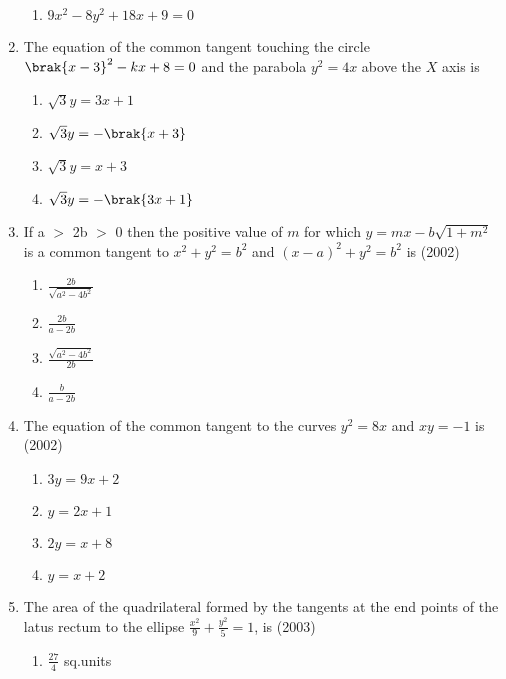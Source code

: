 \begin{enumerate}
\begin{multicols}{2}
\begin{enumerate}
    \item $9x^2-8y^2+18x+9=0$
\end{enumerate}
\end{multicols}
\item The equation of the common tangent touching the circle $\brak{x-3}^2-kx+8=0$ and the parabola $y^2=4x$ above the $X$ axis is 
      \hfill{}
\begin{multicols}{2}
\begin{enumerate}
    \item $\sqrt{3}y=3x+1$
    \item $\sqrt{3}y=-\brak{x+3}$
    \item $\sqrt{3}y=x+3$
    \item $\sqrt{3}y=-\brak{3x+1}$
\end{enumerate}
\end{multicols}
\item If a $>$ 2b $>$ 0 then the positive value of $m$ for which       $y=mx-b\sqrt{1+m^{2}} $ is a common tangent to $x^{2} + y^{2} = b^{2} $ and  $(x-a)^{2} + y^{2} = b^{2}$ is   \hfill {(2002)}
\begin{multicols}{4}
\begin{enumerate}
    \item $\frac{2b}{\sqrt{a^{2}-4b^{2}}}$
    \item $\frac{2b}{a-2b}$
    \item $\frac{\sqrt{a^{2}-4b^{2}}}{2b}$
    \item $\frac{b}{a-2b}$
\end{enumerate}
\end{multicols}
\item The equation of the common tangent to the curves $y^{2}=8x$ and $xy=-1$ is \hfill{(2002)}
\begin{multicols}{4}
\begin{enumerate}
    \item $3y=9x+2$
    \item $y=2x+1$
    \item $2y=x+8$
    \item $y=x+2$
\end{enumerate}
\end{multicols}
\item The area of the quadrilateral formed by the tangents at the end points of the latus rectum to the ellipse $\frac{x^{2}}{9}+\frac{y^{2}}{5}=1$, is \hfill{(2003)}
 \begin{multicols}{2}
\begin{enumerate}
	\item $\frac{27}{4}$ sq.units

\end{enumerate}
\end{multicols}
\end{enumerate}
